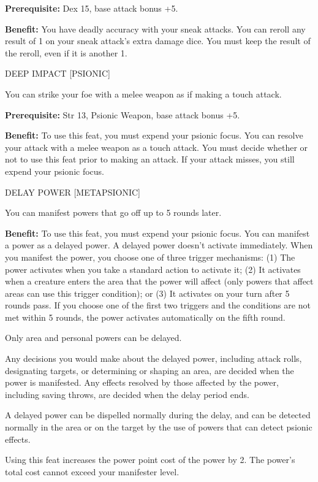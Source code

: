 \documentclass{article}
\begin{document}
\textbf{Prerequisite:} Dex 15, base attack bonus +5.

\textbf{Benefit:} You have deadly accuracy with your sneak attacks. You can reroll 
any result of 1 on your sneak attack's extra damage dice. You must keep the result 
of the reroll, even if it is another 1.

\vspace{12pt}
DEEP IMPACT [PSIONIC]

You can strike your foe with a melee weapon as if making a touch attack.

\textbf{Prerequisite:} Str 13, Psionic Weapon, base attack bonus +5.

\textbf{Benefit:} To use this feat, you must expend your psionic focus. You can 
resolve your attack with a melee weapon as a touch attack. You must decide whether 
or not to use this feat prior to making an attack. If your attack misses, you still 
expend your psionic focus.

\vspace{12pt}
DELAY POWER [METAPSIONIC]

You can manifest powers that go off up to 5 rounds later.

\textbf{Benefit:} To use this feat, you must expend your psionic focus. You can 
manifest a power as a delayed power. A delayed power doesn't activate immediately. 
When you manifest the power, you choose one of three trigger mechanisms: (1) The 
power activates when you take a standard action to activate it; (2) It activates 
when a creature enters the area that the power will affect (only powers that affect 
areas can use this trigger condition); or (3) It activates on your turn after 5 
rounds pass. If you choose one of the first two triggers and the conditions are 
not met within 5 rounds, the power activates automatically on the fifth round.

Only area and personal powers can be delayed.

Any decisions you would make about the delayed power, including attack rolls, designating 
targets, or determining or shaping an area, are decided when the power is manifested. 
Any effects resolved by those affected by the power, including saving throws, are 
decided when the delay period ends.

A delayed power can be dispelled normally during the delay, and can be detected 
normally in the area or on the target by the use of powers that can detect psionic 
effects. 

Using this feat increases the power point cost of the power by 2. The power's total 
cost cannot exceed your manifester level.
\end{document}
